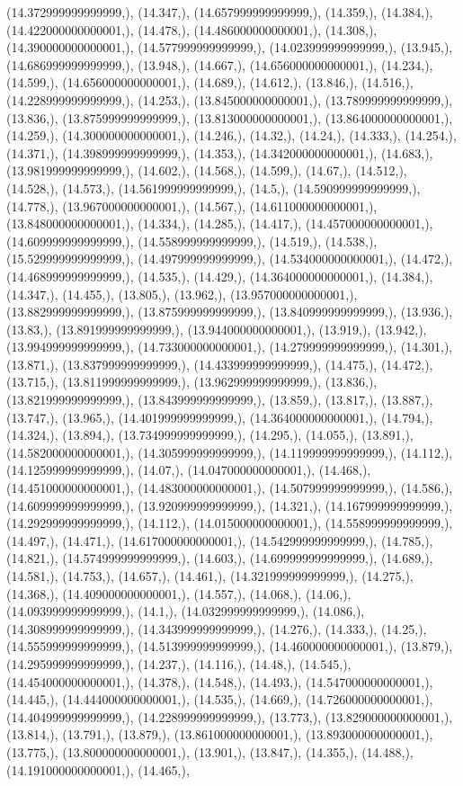 \documentclass{article}
\begin{document}
(14.372999999999999,), (14.347,), (14.657999999999999,), (14.359,), (14.384,), (14.422000000000001,), (14.478,), (14.486000000000001,), (14.308,), (14.390000000000001,), (14.577999999999999,), (14.023999999999999,), (13.945,), (14.686999999999999,), (13.948,), (14.667,), (14.656000000000001,), (14.234,), (14.599,), (14.656000000000001,), (14.689,), (14.612,), (13.846,), (14.516,), (14.228999999999999,), (14.253,), (13.845000000000001,), (13.789999999999999,), (13.836,), (13.875999999999999,), (13.813000000000001,), (13.864000000000001,), (14.259,), (14.300000000000001,), (14.246,), (14.32,), (14.24,), (14.333,), (14.254,), (14.371,), (14.398999999999999,), (14.353,), (14.342000000000001,), (14.683,), (13.981999999999999,), (14.602,), (14.568,), (14.599,), (14.67,), (14.512,), (14.528,), (14.573,), (14.561999999999999,), (14.5,), (14.590999999999999,), (14.778,), (13.967000000000001,), (14.567,), (14.611000000000001,), (13.848000000000001,), (14.334,), (14.285,), (14.417,), (14.457000000000001,), (14.609999999999999,), (14.558999999999999,), (14.519,), (14.538,), (15.529999999999999,), (14.497999999999999,), (14.534000000000001,), (14.472,), (14.468999999999999,), (14.535,), (14.429,), (14.364000000000001,), (14.384,), (14.347,), (14.455,), (13.805,), (13.962,), (13.957000000000001,), (13.882999999999999,), (13.875999999999999,), (13.840999999999999,), (13.936,), (13.83,), (13.891999999999999,), (13.944000000000001,), (13.919,), (13.942,), (13.994999999999999,), (14.733000000000001,), (14.279999999999999,), (14.301,), (13.871,), (13.837999999999999,), (14.433999999999999,), (14.475,), (14.472,), (13.715,), (13.811999999999999,), (13.962999999999999,), (13.836,), (13.821999999999999,), (13.843999999999999,), (13.859,), (13.817,), (13.887,), (13.747,), (13.965,), (14.401999999999999,), (14.364000000000001,), (14.794,), (14.324,), (13.894,), (13.734999999999999,), (14.295,), (14.055,), (13.891,), (14.582000000000001,), (14.305999999999999,), (14.119999999999999,), (14.112,), (14.125999999999999,), (14.07,), (14.047000000000001,), (14.468,), (14.451000000000001,), (14.483000000000001,), (14.507999999999999,), (14.586,), (14.609999999999999,), (13.920999999999999,), (14.321,), (14.167999999999999,), (14.292999999999999,), (14.112,), (14.015000000000001,), (14.558999999999999,), (14.497,), (14.471,), (14.617000000000001,), (14.542999999999999,), (14.785,), (14.821,), (14.574999999999999,), (14.603,), (14.699999999999999,), (14.689,), (14.581,), (14.753,), (14.657,), (14.461,), (14.321999999999999,), (14.275,), (14.368,), (14.409000000000001,), (14.557,), (14.068,), (14.06,), (14.093999999999999,), (14.1,), (14.032999999999999,), (14.086,), (14.308999999999999,), (14.343999999999999,), (14.276,), (14.333,), (14.25,), (14.555999999999999,), (14.513999999999999,), (14.460000000000001,), (13.879,), (14.295999999999999,), (14.237,), (14.116,), (14.48,), (14.545,), (14.454000000000001,), (14.378,), (14.548,), (14.493,), (14.547000000000001,), (14.445,), (14.444000000000001,), (14.535,), (14.669,), (14.726000000000001,), (14.404999999999999,), (14.228999999999999,), (13.773,), (13.829000000000001,), (13.814,), (13.791,), (13.879,), (13.861000000000001,), (13.893000000000001,), (13.775,), (13.800000000000001,), (13.901,), (13.847,), (14.355,), (14.488,), (14.191000000000001,), (14.465,), 
\end{document}
